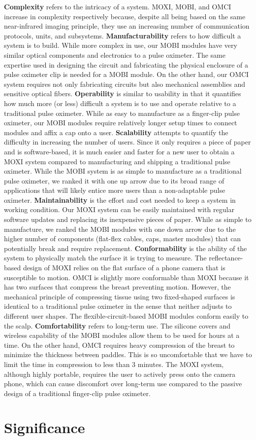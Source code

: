 \textbf{Complexity} refers to the intricacy of a system. \ac{MOXI}, \ac{MOBI}, and \ac{OMCI} increase in complexity respectively because, despite all being based on the same near-infrared imaging principle, they use an increasing number of communication protocols, units, and subsystems. 
\textbf{Manufacturability} refers to how difficult a system is to build. While more complex in use, our \ac{MOBI} modules have very similar optical components and electronics to a pulse oximeter. The same expertise used in designing the circuit and fabricating the physical enclosure of a pulse oximeter clip is needed for a \ac{MOBI} module. On the other hand, our \ac{OMCI} system requires not only fabricating circuits but also mechanical assemblies and sensitive optical fibers. 
\textbf{Operability} is similar to usability in that it quantifies how much more (or less) difficult a system is to use and operate relative to a traditional pulse oximeter. While as easy to manufacture as a finger-clip pulse oximeter, our \ac{MOBI} modules require relatively longer setup times to connect modules and affix a cap onto a user. 
\textbf{Scalability} attempts to quantify the difficulty in increasing the number of users. Since it only requires a piece of paper and is software-based, it is much easier and faster for a new user to obtain a \ac{MOXI} system compared to manufacturing and shipping a traditional pulse oximeter.  While the \ac{MOBI} system is as simple to manufacture as a traditional pulse oximeter, we ranked it with one up arrow due to its broad range of applications that will likely entice more users than a non-adaptable pulse oximeter. 
\textbf{Maintainability} is the effort and cost needed to keep a system in working condition. Our \ac{MOXI} system can be easily maintained with regular software updates and replacing its inexpensive pieces of paper. While as simple to manufacture, we ranked the \ac{MOBI} modules with one down arrow due to the higher number of components (flat-flex cables, caps, master modules) that can potentially break and require replacement. 
\textbf{Conformability} is the ability of the system to physically match the surface it is trying to measure. The reflectance-based design of \ac{MOXI} relies on the flat surface of a phone camera that is susceptible to motion. \ac{OMCI} is slightly more conformable than \ac{MOXI} because it has two surfaces that compress the breast preventing motion. However, the mechanical principle of compressing tissue using two fixed-shaped surfaces is identical to a traditional pulse oximeter in the sense that neither adjusts to different user shapes. The flexible-circuit-based \ac{MOBI} modules conform easily to the scalp. 
\textbf{Comfortability} refers to long-term use. The silicone covers and wireless capability of the \ac{MOBI} modules allow them to be used for hours at a time. On the other hand, \ac{OMCI} requires heavy compression of the breast to minimize the thickness between paddles. This is so uncomfortable that we have to limit the time in compression to less than 3 minutes. The \ac{MOXI} system, although highly portable, requires the user to actively press onto the camera phone, which can cause discomfort over long-term use compared to the passive design of a traditional finger-clip pulse oximeter. 




\section{Significance}